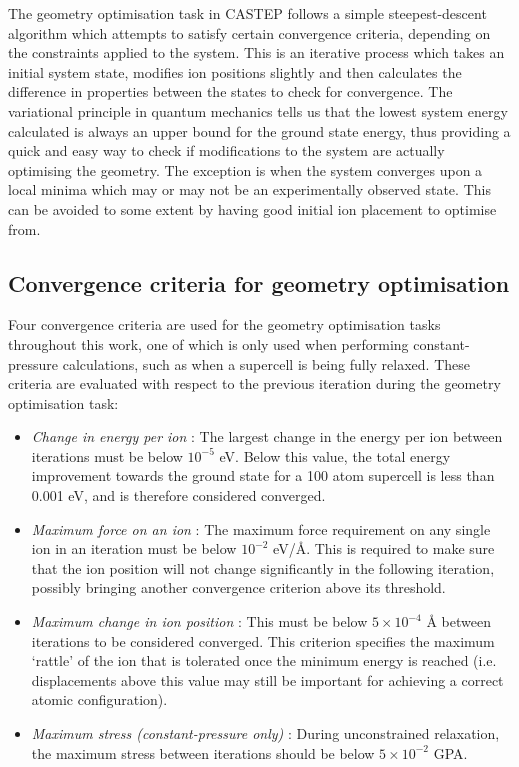 The geometry optimisation task in CASTEP follows a simple steepest-descent algorithm which attempts to satisfy certain convergence criteria, depending on the constraints applied to the system. This is an iterative process which takes an initial system state, modifies ion positions slightly and then calculates the difference in properties between the states to check for convergence. The variational principle in quantum mechanics tells us that the lowest system energy calculated is always an upper bound for the ground state energy, thus providing a quick and easy way to check if modifications to the system are actually optimising the geometry. The exception is when the system converges upon a local minima which may or may not be an experimentally observed state. This can be avoided to some extent by having good initial ion placement to optimise from.


\subsection{Convergence criteria for geometry optimisation}

Four convergence criteria are used for the geometry optimisation tasks throughout this work, one of which is only used when performing constant-pressure calculations, such as when a supercell is being fully relaxed. These criteria are evaluated with respect to the previous iteration during the geometry optimisation task:

\begin{itemize}
\item \emph{Change in energy per ion} : The largest change in the energy per ion between iterations must be below $10^{-5}$ eV. Below this value, the total energy improvement towards the ground state for a 100 atom supercell is less than 0.001 eV, and is therefore considered converged.
\item \emph{Maximum force on an ion} : The maximum force requirement on any single ion in an iteration must be below $10^{-2}$ eV/\r{A}. This is required to make sure that the ion position will not change significantly in the following iteration, possibly bringing another convergence criterion above its threshold.
\item \emph{Maximum change in ion position} : This must be below $5 \times 10^{-4}$ \r{A} between iterations to be considered converged. This criterion specifies the maximum `rattle' of the ion that is tolerated once the minimum energy is reached (i.e. displacements above this value may still be important for achieving a correct atomic configuration). 
\item \emph{Maximum stress (constant-pressure only)} : During unconstrained relaxation, the maximum stress between iterations should be below $5 \times 10^{-2}$ GPA. 
\end{itemize}


